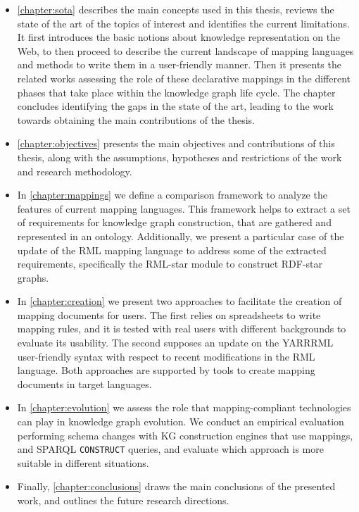 \begin{itemize}
    \item \cref{chapter:sota} describes the main concepts used in this thesis, reviews the state of the art of the topics of interest and identifies the current limitations. It first introduces the basic notions about knowledge representation on the Web, to then proceed to describe the current landscape of mapping languages and methods to write them in a user-friendly manner. Then it presents the related works assessing the role of these declarative mappings in the different phases that take place within the knowledge graph life cycle. The chapter concludes identifying the gaps in the state of the art, leading to the work towards obtaining the main contributions of the thesis.
    
    \item \cref{chapter:objectives} presents the main objectives and contributions of this thesis, along with the assumptions, hypotheses and restrictions of the work and research methodology. 
    
    \item In \cref{chapter:mappings} we define a comparison framework to analyze the features of current mapping languages. This framework helps to extract a set of requirements for knowledge graph construction, that are gathered and represented in an ontology. Additionally, we present a particular case of the update of the RML mapping language to address some of the extracted requirements, specifically the RML-star module to construct RDF-star graphs.
    
    \item In \cref{chapter:creation} we present two approaches to facilitate the creation of mapping documents for users. The first relies on spreadsheets to write mapping rules, and it is tested with real users with different backgrounds to evaluate its usability. The second supposes an update on the YARRRML user-friendly syntax with respect to recent modifications in the RML language. Both approaches are supported by tools to create mapping documents in target languages. 
    
    \item In \cref{chapter:evolution} we assess the role that mapping-compliant technologies can play in knowledge graph evolution. We conduct an empirical evaluation performing schema changes with KG construction engines that use mappings, and SPARQL \texttt{CONSTRUCT} queries, and evaluate which approach is more suitable in different situations. 
    
    \item Finally, \cref{chapter:conclusions} draws the main conclusions of the presented work, and outlines the future research directions. 
    
\end{itemize}



